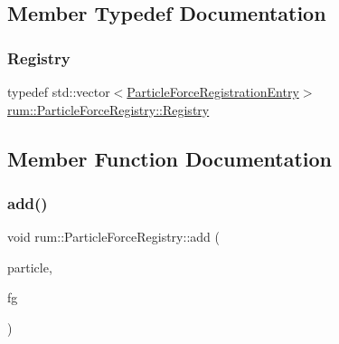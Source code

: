\subsection{Member Typedef Documentation}
\mbox{\label{classrum_1_1_particle_force_registry_a63b7b5a4c79dafe5b3658505c7ac1163}} 
\subsubsection{\texorpdfstring{Registry}{Registry}}
{\footnotesize\ttfamily typedef std\+::vector$<$\mbox{\hyperlink{structrum_1_1_particle_force_registry_1_1_particle_force_registration_entry}{Particle\+Force\+Registration\+Entry}}$>$ \mbox{\hyperlink{classrum_1_1_particle_force_registry_a63b7b5a4c79dafe5b3658505c7ac1163}{rum\+::\+Particle\+Force\+Registry\+::\+Registry}}\hspace{0.3cm}{\ttfamily [protected]}}



\subsection{Member Function Documentation}
\mbox{\label{classrum_1_1_particle_force_registry_a9297d30559870d6a33a459430d2ac757}} 
\subsubsection{\texorpdfstring{add()}{add()}}
{\footnotesize\ttfamily void rum\+::\+Particle\+Force\+Registry\+::add (\begin{DoxyParamCaption}\item[{\mbox{\hyperlink{classrum_1_1_particle}{Particle}} $\ast$}]{particle,  }\item[{\mbox{\hyperlink{classrum_1_1_particle_force_generator}{Particle\+Force\+Generator}} $\ast$}]{fg }\end{DoxyParamCaption})}

\mbox{\label{classrum_1_1_particle_force_registry_a856ccf8959632accfbec1abf67813b71}} 
